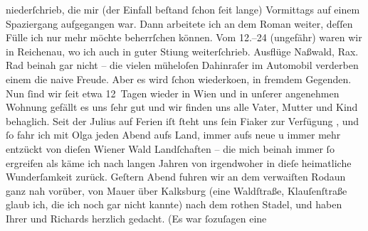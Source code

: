 \begin{ledgroupsized}[t]{13cm}
               niederſchrieb, die mir (der Einfall beſtand ſchon ſeit {\pb}lange) Vormittags auf einem Spaziergang aufgegangen war. Dann
               arbeitete ich an dem Roman
               weiter, deſſen Fülle ich nur mehr möchte beherrſchen können. Vom
                  12.–24 (ungefähr) waren wir in Reichenau, wo ich auch in guter Sti{\geminationm}ung weiterſchrieb. Ausflüge Naßwald, Rax. Rad beinah gar nicht – die vielen müheloſen
               Dahinraſer im Automobil verderben einem die naive Freude. Aber es wird ſchon
                  wiederko{\geminationm}en, in fremdem Gegenden.\pend
           \pstart
           Nun ſind wir ſeit etwa 12 Tagen wieder in Wien und in
               unſerer {\pb}angenehmen Wohnung gefällt es uns ſehr gut und
               wir finden uns alle Vater, Mutter und Kind
               behaglich. Seit der Julius auf Ferien iſt ſteht
               uns ſein Fiaker zur Verfügung , und ſo fahr ich
               mit Olga jeden Abend aufs Land, immer aufs neue u
               immer mehr entzückt von dieſen Wiener Wald
               Landſchaften – die mich beinah immer ſo ergreifen als käme ich nach langen Jahren von
               irgendwoher in dieſe heimatliche Wunderſamkeit zurück. Geſtern Abend fuhren wir an
               dem verwaiſten Ro{\pb}daun
               ganz nah vorüber, von Mauer über Kalksburg (eine Waldſtraße, Klauſenſtraße glaub ich, die ich noch gar nicht kannte) nach dem rothen Stadel, und haben Ihrer und Richards herzlich gedacht. (Es war ſozuſagen eine

\end{ledgroupsized}
